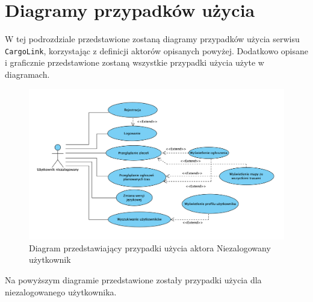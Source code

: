\section{Diagramy przypadków użycia}
W tej podrozdziale przedstawione zostaną diagramy przypadków użycia serwisu \texttt{CargoLink}, korzystając z definicji aktorów opisanych powyżej. Dodatkowo opisane i graficznie przedstawione zostaną wszystkie przypadki użycia użyte w diagramach.
\begin{figure}[H]
	\centering
		\includegraphics[width=\linewidth]{rozdzial1/PU_niezalogowany_uzytkownik.png}
	\caption{Diagram przedstawiający przypadki użycia aktora Niezalogowany użytkownik}
	\label{Rys. fig:Diagram przedstawiający przypadki użycia aktora Niezalogowany użytkownik}
\end{figure}
Na powyższym diagramie przedstawione zostały przypadki użycia dla niezalogowanego użytkownika. \\

